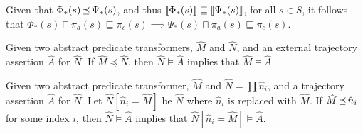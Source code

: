 Given that $\Phi_{*}(s) \operatorname{\mathrel{\preceq}} \Psi_{*}(s)$, and thus $\llbracket\Phi_{*}(s)\rrbracket \sqsubseteq \llbracket\Psi_{*}(s)\rrbracket$, for all $s \in S$, it follows that $\Phi_{*}(s) \sqcap \pi_{a}(s) \sqsubseteq \pi_{c}(s) \implies \Psi_{*}(s) \sqcap \pi_{a}(s) \sqsubseteq \pi_{c}(s)$.

\begin{theorem}
Given two abstract predicate transformers, $\hat M$ and $\hat N$, and an external trajectory assertion $\hat A$ for $\hat N$. If $\hat M \preceq \hat N$, then $\hat N \models \hat A$ implies that $\hat M \models \hat A$.
\end{theorem}

\begin{corollary}
Given two abstract predicate transformer, $\hat M$ and $\hat N = \prod \hat n_{i}$, and a trajectory assertion $\hat A$ for $\hat N$. Let $\hat N[\hat n_{i} = \hat M]$ be $\hat N$ where $\hat n_{i}$ is replaced with $\hat M$. If $\hat M \operatorname{\mathrel{\preceq}} \hat n_{i}$ for some index $i$, then $\hat N \models \hat A$ implies that $\hat N[\hat n_{i} = \hat M] \models \hat A$.
\end{corollary}


